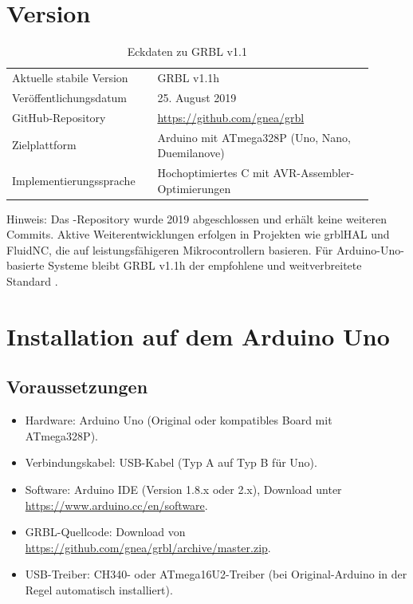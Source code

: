 \section{Version}

\begin{longtable}{p{0.35\linewidth}p{0.55\linewidth}}
	\caption{Eckdaten zu GRBL v1.1}\label{tab:grbl_version}\\
	\hline
	Aktuelle stabile Version & GRBL v1.1h \\
	Veröffentlichungsdatum & 25. August 2019 \\
	GitHub-Repository & \url{https://github.com/gnea/grbl} \\
	Zielplattform & Arduino mit ATmega328P (Uno, Nano, Duemilanove) \\
	Implementierungssprache & Hochoptimiertes C mit AVR-Assembler-Optimierungen \\
	\hline
\end{longtable}

Hinweis: Das -Repository wurde 2019 abgeschlossen und erhält keine weiteren Commits. Aktive Weiterentwicklungen erfolgen in Projekten wie grblHAL und FluidNC, die auf leistungsfähigeren Mikrocontrollern basieren. Für Arduino-Uno-basierte Systeme bleibt GRBL v1.1h der empfohlene und weitverbreitete Standard \cite{grbl:github}.

\section{Installation auf dem Arduino Uno}

\subsection{Voraussetzungen}

\begin{itemize}
	\item Hardware: Arduino Uno (Original oder kompatibles Board mit ATmega328P).
	\item Verbindungskabel: USB-Kabel (Typ A auf Typ B für Uno).
	\item Software: Arduino IDE (Version 1.8.x oder 2.x), Download unter \url{https://www.arduino.cc/en/software}.
	\item GRBL-Quellcode: Download von \url{https://github.com/gnea/grbl/archive/master.zip}.
	\item USB-Treiber: CH340- oder ATmega16U2-Treiber (bei Original-Arduino in der Regel automatisch installiert).
\end{itemize}


